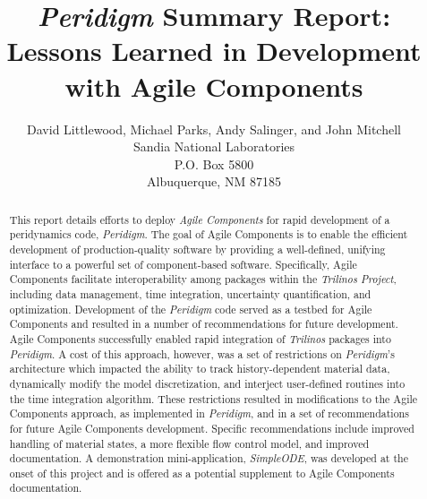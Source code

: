 \documentclass[pdf,ps2pdf,12pt,report]{SANDreport}
\title{\emph{Peridigm} Summary Report:\\Lessons Learned in Development with Agile Components}
\author{David Littlewood,  Michael Parks, Andy Salinger, and John Mitchell \\
	  Sandia National Laboratories\\
	  P.O. Box 5800\\
	  Albuquerque, NM 87185 \\
	 }
\date{}
\theoremstyle{plain}
\theoremstyle{definition}
\theoremstyle{remark}
\numberwithin{equation}{section}
\begin{document}
    \maketitle

\begin{abstract}
This report details efforts to deploy \emph{Agile Components} for rapid development of a peridynamics code, \emph{Peridigm}.  The goal of Agile Components is to enable the efficient development of production-quality software by providing a well-defined, unifying interface to a powerful set of component-based software.  Specifically, Agile Components facilitate interoperability among packages within the \emph{Trilinos Project}, including data management, time integration, uncertainty quantification, and optimization.  Development of the \emph{Peridigm} code served as a testbed for Agile Components and resulted in a number of recommendations for future development.  Agile Components successfully enabled rapid integration of \emph{Trilinos} packages into \emph{Peridigm}.  A cost of this approach, however, was a set of restrictions on \emph{Peridigm}'s architecture which impacted the ability to track history-dependent material data, dynamically modify the model discretization, and interject user-defined routines into the time integration algorithm.  These restrictions resulted in modifications to the Agile Components approach, as implemented in \emph{Peridigm}, and in a set of recommendations for future Agile Components development.  Specific recommendations include improved handling of material states, a more flexible flow control model, and improved documentation.  A demonstration mini-application, \emph{SimpleODE}, was developed at the onset of this project and is offered as a potential supplement to Agile Components documentation.
\end{abstract}


    \cleardoublepage		%
    \tableofcontents
    \listoffigures
    \listoftables


\end{document}
